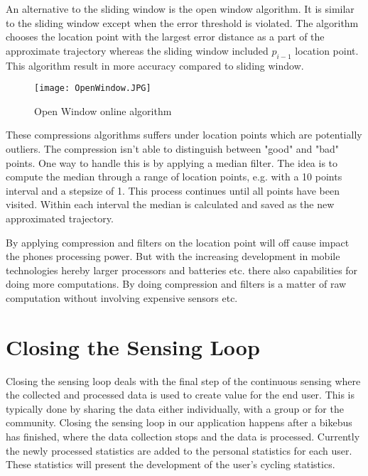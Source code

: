 An alternative to the sliding window is the open window algorithm. It is similar to the sliding window except when the error threshold is violated. The algorithm chooses the location point with the largest error distance as a part of the approximate trajectory whereas the sliding window included $p_{i-1}$ location point. This algorithm result in more accuracy compared to sliding window. 

\begin{figure}[H]
\centering
\texttt{[image: OpenWindow.JPG]}

\caption{Open Window online algorithm}
\label{fig:open_window_algorithm}
\end{figure}

These compressions algorithms suffers under location points which are potentially outliers. The compression isn't able to distinguish between "good" and "bad" points. One way to handle this is by applying a median filter. The idea is to compute the median through a range of location points, e.g. with a 10 points interval and a stepsize of 1. This process continues until all points have been visited. Within each interval the median is calculated and saved as the new approximated trajectory.

By applying compression and filters on the location point will off cause impact the phones processing power. But with the increasing development in mobile technologies hereby larger processors and batteries etc. there also capabilities for doing more computations. By doing compression and filters is a matter of raw computation without involving expensive sensors etc.       
\iffalse
Suggestions for further processing:
\begin{itemize}
    \item Median filtering
    \item Advanced statistics calculations (analyse per interval)
    \item Algorithm to balance the trade-off between processing space and time (Appendix \ref{app:processing_algorithm})
\end{itemize}
\fi

\section{Closing the Sensing Loop}
Closing the sensing loop deals with the final step of the continuous sensing where the collected and processed data is used to create value for the end user.
This is typically done by sharing the data either individually, with a group or for the community. 
Closing the sensing loop in our application happens after a bikebus has finished, where the data collection stops and the data is processed. Currently the newly processed statistics are added to the personal statistics for each user. These statistics will present the development of the user's cycling statistics.

